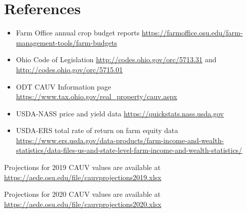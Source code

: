 \documentclass[]{article}
\providecommand{\tightlist}{%
  \setlength{\itemsep}{0pt}\setlength{\parskip}{0pt}}
\begin{document}
\hypertarget{references}{%
\section{References}\label{references}}

\begin{itemize}
\tightlist
\item
  Farm Office annual crop budget reports
  \url{https://farmoffice.osu.edu/farm-management-tools/farm-budgets}
\item
  Ohio Code of Legislation \url{http://codes.ohio.gov/orc/5713.31} and
  \url{http://codes.ohio.gov/orc/5715.01}
\item
  ODT CAUV Information page
  \url{https://www.tax.ohio.gov/real_property/cauv.aspx}
\item
  USDA-NASS price and yield data \url{https://quickstats.nass.usda.gov}
\item
  USDA-ERS total rate of return on farm equity data
  \url{https://www.ers.usda.gov/data-products/farm-income-and-wealth-statistics/data-files-us-and-state-level-farm-income-and-wealth-statistics/}
\end{itemize}

Projections for 2019 CAUV values are available at
\url{https://aede.osu.edu/file/cauvprojections2019.xlsx}

Projections for 2020 CAUV values are available at
\url{https://aede.osu.edu/file/cauvprojections2020.xlsx}
\end{document}
